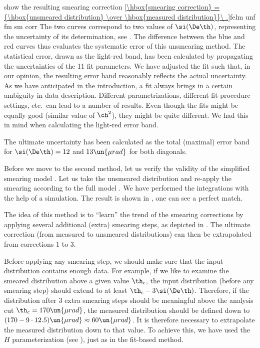  show the resulting smearing correction
\eqref{\hbox{smearing correction} = {\hbox{unsmeared distribution} \over \hbox{measured distribution}}\ .}{felm unf fm sm corr}
The two curves correspond to two values of $\si(\De\th)$, representing the uncertainty of its determination, see . The difference between the blue and red curves thus evaluates the systematic error of this unsmearing method. The statistical error, drawn as the light-red band, has been calculated by propagating the uncertainties of the 11 fit parameters. We have adjusted the fit such that, in our opinion, the resulting error band reasonably reflects the actual uncertainty. As we have anticipated in the introduction, a fit always brings in a certain ambiguity in data description. Different parametrizations, different fit-procedure settings, etc.~can lead to a number of results. Even though the fits might be equally good (similar value of $\ch^2$), they might be quite different. We had this in mind when calculating the light-red error band.

The ultimate uncertainty has been calculated as the total (maximal) error band for $\si(\De\th) = 12$ and $13\un{\mu rad}$ for both diagonals.

Before we move to the second method, let us verify the validity of the simplified smearing model . Let us take the unsmeared distribution and re-apply the smearing according to the full model . We have performed the integrations with the help of a  simulation. The result is shown in , one can see a perfect match.



The idea of this method is to ``learn'' the trend of the smearing corrections by applying several additional (extra) smearing steps, as depicted in . The ultimate correction (from measured to unsmeared distributions) can then be extrapolated from corrections 1 to 3.


Before applying any smearing step, we should make sure that the input distribution contains enough data. For example, if we like to examine the smeared distribution above a given value $\th_{\rm c}$, the input distribution (before any smearing step) should extend to at least $\th_{\rm c} -3\si(\De\th)$. Therefore, if the distribution after 3 extra smearing steps should be meaningful above the analysis cut $\th_c = 170\un{\mu rad}$, the measured distribution should be defined down to $(170 - 9\cdot 12.5) \un{\mu rad}\approx 60 \un{\mu rad}$. It is therefore necessary to extrapolate the measured distribution down to that value. To achieve this, we have used the $H$ parameterization (see ), just as in the fit-based method.

